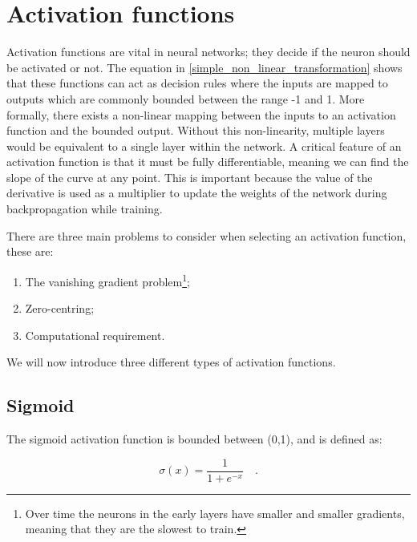     \section{Activation functions} \label{activation_functions}
        Activation functions are vital in neural networks; they decide if the neuron should be activated or not. The equation in \ref{simple_non_linear_transformation} shows that these functions can act as decision rules where the inputs are mapped to outputs which are commonly bounded between the range -1 and 1. More formally, there exists a non-linear mapping between the inputs to an activation function and the bounded output. Without this non-linearity, multiple layers would be equivalent to a single layer within the network. A critical feature of an activation function is that it must be fully differentiable, meaning we can find the slope of the curve at any point. This is important because the value of the derivative is used as a multiplier to update the weights of the network during backpropagation while training. 
        
        There are three main problems to consider when selecting an activation function, these are:
        
        \begin{enumerate}
            \item The vanishing gradient problem\footnote{Over time the neurons in the early layers have smaller and smaller gradients, meaning that they are the slowest to train.};
            \item Zero-centring;
            \item Computational requirement.
        \end{enumerate}
        
       
        
        \noindent We will now introduce three different types of activation functions. 
    
        \subsection{Sigmoid} \label{sigmoid}
            The sigmoid activation function is bounded between (0,1), and is defined as:
            
            \begin{equation}
                \sigma(x) = \frac{1}{ 1 + e^{-x} } \quad.
            \end{equation}
             
            \vspace*{1cm}
            
